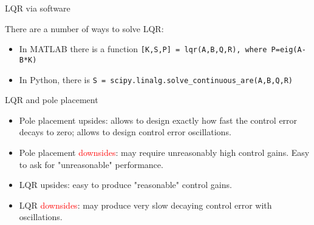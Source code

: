 \documentclass{beamer}
\begin{document}
\begin{frame}{LQR via software}
\begin{flushleft}

There are a number of ways to solve LQR:

\bigskip

\begin{itemize}
    \item In MATLAB there is a function \texttt{[K,S,P] = lqr(A,B,Q,R), where P=eig(A-B*K)}
    \item In Python, there is \texttt{S = scipy.linalg.solve\_continuous\_are(A,B,Q,R)}
\end{itemize}

\end{flushleft}
\end{frame}



\begin{frame}{LQR and pole placement}
	\begin{flushleft}
		
		\begin{itemize}
			\item Pole placement \textcolor{mydarkgreen}{upsides}: allows to design exactly how fast the control error decays to zero; allows to design control error oscillations.
			
			\item Pole placement \textcolor{red}{downsides}: may require unreasonably high control gains. Easy to ask for "unreasonable" performance.
			
			\item LQR \textcolor{mydarkgreen}{upsides}: easy to produce "reasonable" control gains.
			
			\item LQR \textcolor{red}{downsides}: may produce very slow decaying control error with oscillations.
		\end{itemize}
		
		
	\end{flushleft}
\end{frame}
\end{document}
